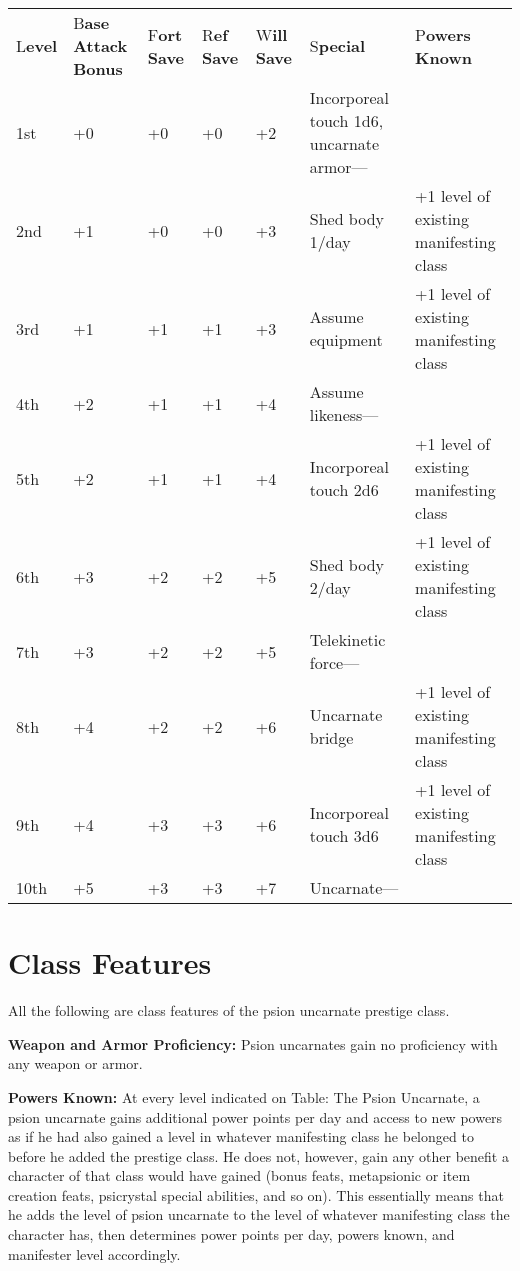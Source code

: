 \documentclass{article}
\begin{document}
\vspace{12pt}
\begin{tabular}{|>{\raggedright}p{16pt}|>{\raggedright}p{33pt}|>{\raggedright}p{17pt}|>{\raggedright}p{17pt}|>{\raggedright}p{19pt}|>{\raggedright}p{64pt}|>{\raggedright}p{97pt}|}
\hline
\multicolumn{7}{|p{266pt}|}{T\textbf{able: The Psion Uncarnate}}\tabularnewline
\hline
L\textbf{evel} & B\textbf{ase Attack Bonus} & F\textbf{ort Save} & R\textbf{ef 
Save} & W\textbf{ill Save} & S\textbf{pecial} & P\textbf{owers Known}\tabularnewline
\hline
1st & +0 & +0 & +0 & +2 & Incorporeal touch 1d6, uncarnate armor--- & \tabularnewline
\hline
2nd & +1 & +0 & +0 & +3 & Shed body 1/day & +1 level of existing manifesting class\tabularnewline
\hline
3rd & +1 & +1 & +1 & +3 & Assume equipment & +1 level of existing manifesting class\tabularnewline
\hline
4th & +2 & +1 & +1 & +4 & Assume likeness--- & \tabularnewline
\hline
5th & +2 & +1 & +1 & +4 & Incorporeal touch 2d6 & +1 level of existing manifesting 
class\tabularnewline
\hline
6th & +3 & +2 & +2 & +5 & Shed body 2/day & +1 level of existing manifesting class\tabularnewline
\hline
7th & +3 & +2 & +2 & +5 & Telekinetic force--- & \tabularnewline
\hline
8th & +4 & +2 & +2 & +6 & Uncarnate bridge & +1 level of existing manifesting class\tabularnewline
\hline
9th & +4 & +3 & +3 & +6 & Incorporeal touch 3d6 & +1 level of existing manifesting 
class\tabularnewline
\hline
10th & +5 & +3 & +3 & +7 & Uncarnate--- & \tabularnewline
\hline
\end{tabular}

\vspace{12pt}
\section*{\textbf{Class Features}}

All the following are class features of the psion uncarnate prestige class.

\textbf{Weapon and Armor Proficiency:} Psion uncarnates gain no proficiency with 
any weapon or armor.

\textbf{Powers Known:} At every level indicated on Table: The Psion Uncarnate, 
a psion uncarnate gains additional power points per day and access to new powers 
as if he had also gained a level in whatever manifesting class he belonged to before 
he added the prestige class. He does not, however, gain any other benefit a character 
of that class would have gained (bonus feats, metapsionic or item creation feats, 
psicrystal special abilities, and so on). This essentially means that he adds the 
level of psion uncarnate to the level of whatever manifesting class the character 
has, then determines power points per day, powers known, and manifester level accordingly.
\end{document}
